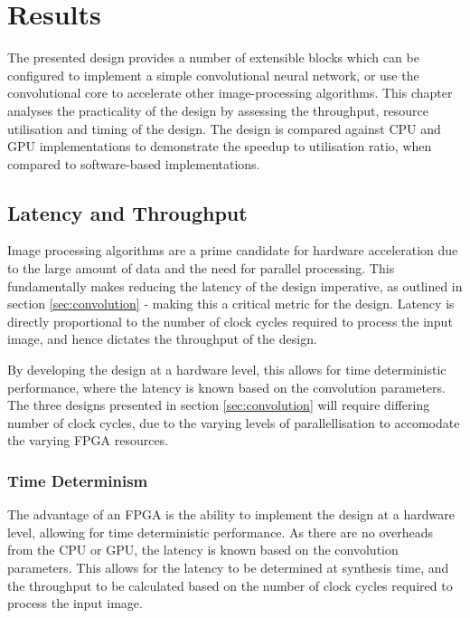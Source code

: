
\chapter[Results]{Results}
\label{chap:Results}	%
\pagestyle{headings}


The presented design provides a number of extensible blocks which can be configured to implement a simple convolutional neural network, or use the convolutional core to accelerate other image-processing algorithms. 
This chapter analyses the practicality of the design by assessing the throughput, resource utilisation and timing of the design.
The design is compared against CPU and GPU implementations to demonstrate the speedup to utilisation ratio, when compared to software-based implementations.

\section{Latency and Throughput}

Image processing algorithms are a prime candidate for hardware acceleration due to the large amount of data and the need for parallel processing.
This fundamentally makes reducing the latency of the design imperative, as outlined in section \ref{sec:convolution} - making this a critical metric for the design.
Latency is directly proportional to the number of clock cycles required to process the input image, and hence dictates the throughput of the design.

By developing the design at a hardware level, this allows for time deterministic performance, where the latency is known based on the convolution parameters.
The three designs presented in section \ref{sec:convolution} will require differing number of clock cycles, due to the varying levels of parallellisation to accomodate the varying FPGA resources.

\subsection{Time Determinism}
The advantage of an FPGA is the ability to implement the design at a hardware level, allowing for time deterministic performance.
As there are no overheads from the CPU or GPU, the latency is known based on the convolution parameters.
This allows for the latency to be determined at synthesis time, and the throughput to be calculated based on the number of clock cycles required to process the input image.

